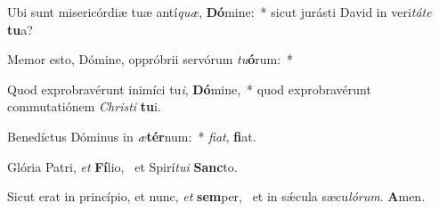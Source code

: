 \item Ubi sunt misericórdiæ tuæ antí\textit{quæ}, \textbf{Dó}mine:~* sicut jurásti David in veri\textit{tá}\textit{te} \textbf{tu}a?
\item Memor esto, Dómine, oppróbrii servórum \textit{tu}\textbf{ó}rum:~* 
\item Quod exprobravérunt inimíci tu\textit{i}, \textbf{Dó}mine,~* quod exprobravérunt commutatiónem \textit{Chris}\textit{ti} \textbf{tu}i.
\item Benedíctus Dóminus in \textit{æ}\textbf{tér}num:~* \textit{fi}\textit{at}, \textbf{fi}at.
\item Glória Patri, \textit{et} \textbf{Fí}lio,~\psstar{} et Spirí\textit{tu}\textit{i} \textbf{Sanc}to.
\item Sicut erat in princípio, et nunc, \textit{et} \textbf{sem}per,~\psstar{} et in sǽcula sæcu\textit{ló}\textit{rum}. \textbf{A}men.
